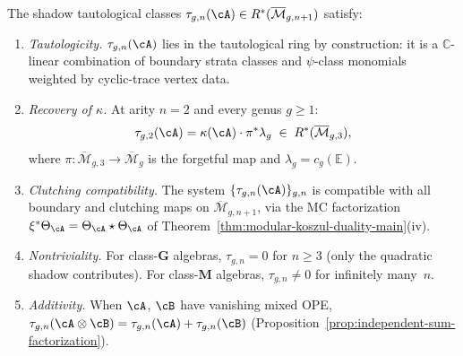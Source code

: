 \begin{theorem}
\label{thm:shadow-tautological-ring}
\ClaimStatusProvedHere
{}
The shadow tautological classes
$\tau_{g,n}(\cA) \in
R^*(\overline{\mathcal{M}}_{g,n+1})$ satisfy:
\begin{enumerate}[label=\textup{(\roman*)}]
\item \emph{Tautologicity.}
  $\tau_{g,n}(\cA)$ lies in the tautological ring by
  construction: it is a $\mathbb{C}$-linear combination of
  boundary strata classes and $\psi$-class monomials
  weighted by cyclic-trace vertex data.

\item \emph{Recovery of $\kappa$.}
  At arity $n = 2$ and every genus $g \geq 1$:
  \[
  \tau_{g,2}(\cA) = \kappa(\cA) \cdot \pi^*\lambda_g
  \;\in\; R^*(\overline{\mathcal{M}}_{g,3}),
  \]
  where $\pi\colon \overline{\mathcal{M}}_{g,3} \to
  \overline{\mathcal{M}}_g$ is the forgetful map
  and $\lambda_g = c_g(\mathbb{E})$.

\item \emph{Clutching compatibility.}
  The system $\{\tau_{g,n}(\cA)\}_{g,n}$ is compatible with
  all boundary and clutching maps on
  $\overline{\mathcal{M}}_{g,n+1}$, via the MC
  factorization
  $\xi^*\Theta_\cA = \Theta_\cA \star \Theta_\cA$
  of
  Theorem~\textup{\ref{thm:modular-koszul-duality-main}}\textup{(iv)}.

\item \emph{Nontriviality.}
  For class-$\mathbf{G}$ algebras, $\tau_{g,n} = 0$ for
  $n \geq 3$ (only the quadratic shadow contributes).
  For class-$\mathbf{M}$ algebras, $\tau_{g,n} \neq 0$ for
  infinitely many~$n$.

\item \emph{Additivity.}
  When $\cA$, $\cB$ have vanishing mixed OPE,
  $\tau_{g,n}(\cA \otimes \cB)
  = \tau_{g,n}(\cA) + \tau_{g,n}(\cB)$
  \textup{(}Proposition~\textup{\ref{prop:independent-sum-factorization}}\textup{)}.
\end{enumerate}
\end{theorem}

